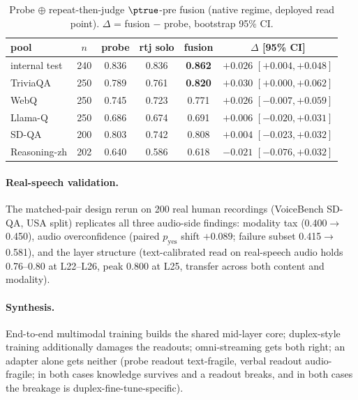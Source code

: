 \begin{table}[h]
\centering\small
\caption{Probe $\oplus$ repeat-then-judge $\ptrue$-pre fusion (native
regime, deployed read point). $\Delta$ = fusion $-$ probe, bootstrap
95\% CI.}
\label{tab:rtjfusion}
\begin{tabular}{lccccc}
\toprule
pool & $n$ & probe & rtj solo & fusion & $\Delta$ [95\% CI] \\
\midrule
internal test & 240 & 0.836 & 0.836 & \textbf{0.862} & $+0.026$ $[+0.004,+0.048]$ \\
TriviaQA & 250 & 0.789 & 0.761 & \textbf{0.820} & $+0.030$ $[+0.000,+0.062]$ \\
WebQ & 250 & 0.745 & 0.723 & 0.771 & $+0.026$ $[-0.007,+0.059]$ \\
Llama-Q & 250 & 0.686 & 0.674 & 0.691 & $+0.006$ $[-0.020,+0.031]$ \\
SD-QA & 200 & 0.803 & 0.742 & 0.808 & $+0.004$ $[-0.023,+0.032]$ \\
Reasoning-zh & 202 & 0.640 & 0.586 & 0.618 & $-0.021$ $[-0.076,+0.032]$ \\
\bottomrule
\end{tabular}
\end{table}

\paragraph{Real-speech validation.} The matched-pair design rerun on
200 real human recordings (VoiceBench SD-QA, USA split) replicates all
three audio-side findings: modality tax (0.400$\to$0.450),
audio overconfidence (paired $p_{\mathrm{yes}}$ shift $+0.089$; failure
subset 0.415$\to$0.581), and the layer structure (text-calibrated read on
real-speech audio holds 0.76--0.80 at L22--L26, peak 0.800 at L25,
transfer across both content and modality).

\paragraph{Synthesis.} End-to-end multimodal training builds the
shared mid-layer core; duplex-style training additionally
damages the readouts; omni-streaming gets both right; an adapter
alone gets neither (probe readout text-fragile, verbal readout
audio-fragile; in both cases knowledge survives and a readout breaks,
and in both cases the breakage is duplex-fine-tune-specific).

